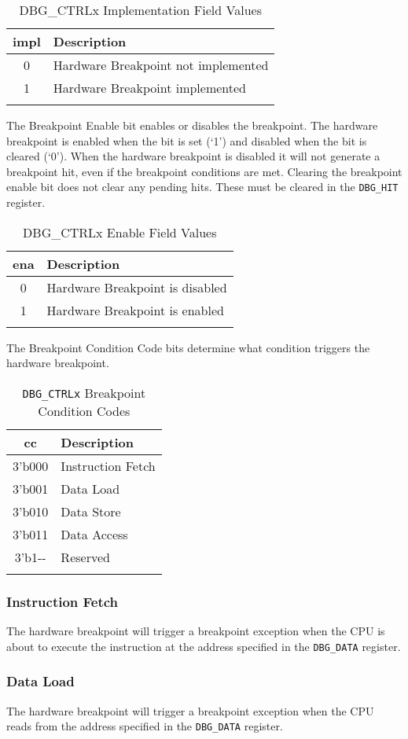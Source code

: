 \begin{longtable}[]{@{}cl@{}}
\toprule
impl & Description\tabularnewline
\midrule
\endhead
0 & Hardware Breakpoint not implemented\tabularnewline
1 & Hardware Breakpoint implemented\tabularnewline
\bottomrule
\caption{DBG\_CTRLx Implementation Field Values}
\end{longtable}


The Breakpoint Enable bit enables or disables the breakpoint. The
hardware breakpoint is enabled when the bit is set (`1') and disabled
when the bit is cleared (`0'). When the hardware breakpoint is disabled
it will not generate a breakpoint hit, even if the breakpoint conditions
are met. Clearing the breakpoint enable bit does not clear any pending
hits. These must be cleared in the \texttt{DBG\_HIT} register.

\begin{longtable}[]{@{}cl@{}}
\toprule
ena & Description\tabularnewline
\midrule
\endhead
0 & Hardware Breakpoint is disabled\tabularnewline
1 & Hardware Breakpoint is enabled\tabularnewline
\bottomrule
\caption{DBG\_CTRLx Enable Field Values}
\end{longtable}


The Breakpoint Condition Code bits determine what condition triggers the
hardware breakpoint.

\begin{longtable}[]{@{}cl@{}}
\toprule
cc & Description\tabularnewline
\midrule
\endhead
3'b000 & Instruction Fetch\tabularnewline
3'b001 & Data Load\tabularnewline
3'b010 & Data Store\tabularnewline
3'b011 & Data Access\tabularnewline
3'b1-\/- & Reserved\tabularnewline
\bottomrule
\caption{\texttt{DBG\_CTRLx} Breakpoint Condition Codes}
\end{longtable} 

\subsubsection{Instruction Fetch}\label{instruction-fetch}

The hardware breakpoint will trigger a breakpoint exception when the CPU
is about to execute the instruction at the address specified in the
\texttt{DBG\_DATA} register.

\subsubsection{Data Load}\label{data-load}

The hardware breakpoint will trigger a breakpoint exception when the CPU
reads from the address specified in the \texttt{DBG\_DATA} register.

